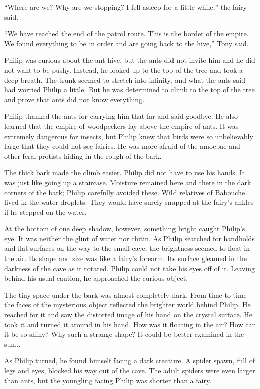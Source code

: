 \documentclass[10pt, draft]{memoir}
\begin{document}
``Where are we? Why are we stopping? I fell asleep for a little while,'' the fairy said.

``We have reached the end of the patrol route. This is the border of the empire. We found everything to be in order and are going back to the hive,'' Tony said.

Philip was curious about the ant hive, but the ants did not invite him and he did not want to be pushy. Instead, he looked up to the top of the tree and took a deep breath. The trunk seemed to stretch into infinity, and what the ants said had worried Philip a little. But he was determined to climb to the top of the tree and prove that ants did not know everything.

Philip thanked the ants for carrying him that far and said goodbye. He also learned that the empire of woodpeckers lay above the empire of ants. It was extremely dangerous for insects, but Philip knew that birds were so unbelievably large that they could not see fairies. He was more afraid of the amoebae and other feral protists hiding in the rough of the bark.

The thick bark made the climb easier. Philip did not have to use his hands. It was just like going up a staircase. Moisture remained here and there in the dark corners of the bark; Philip carefully avoided these. Wild relatives of Babouche lived in the water droplets. They would have surely snapped at the fairy's ankles if he stepped on the water.

At the bottom of one deep shadow, however, something bright caught Philip's eye. It was neither the glint of water nor chitin. As Philip searched for handholds and flat surfaces on the way to the small cave, the brightness seemed to float in the air. Its shape and size was like a fairy's forearm. Its surface gleamed in the darkness of the cave as it rotated. Philip could not take his eyes off of it. Leaving behind his usual caution, he approached the curious object.

The tiny space under the bark was almost completely dark. From time to time the faces of the mysterious object reflected the brighter world behind Philip. He reached for it and saw the distorted image of his hand on the crystal surface. He took it and turned it around in his hand. How was it floating in the air? How can it be so shiny? Why such a strange shape? It could be better examined in the sun...

As Philip turned, he found himself facing a dark creature. A spider spawn, full of legs and eyes, blocked his way out of the cave. The adult spiders were even larger than ants, but the youngling facing Philip was shorter than a fairy.
\end{document}
